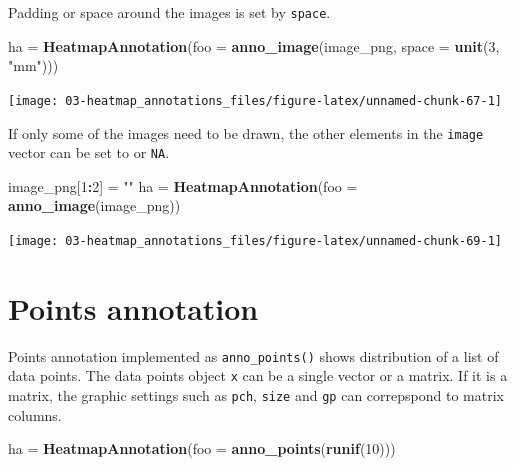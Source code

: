 \documentclass[]{book}
\newenvironment{Shaded}{\begin{snugshade}}{\end{snugshade}}
\newcommand{\KeywordTok}[1]{\textcolor[rgb]{0.13,0.29,0.53}{\textbf{#1}}}
\newcommand{\DataTypeTok}[1]{\textcolor[rgb]{0.13,0.29,0.53}{#1}}
\newcommand{\DecValTok}[1]{\textcolor[rgb]{0.00,0.00,0.81}{#1}}
\newcommand{\StringTok}[1]{\textcolor[rgb]{0.31,0.60,0.02}{#1}}
\newcommand{\OperatorTok}[1]{\textcolor[rgb]{0.81,0.36,0.00}{\textbf{#1}}}
\newcommand{\NormalTok}[1]{#1}
\theoremstyle{definition}
\theoremstyle{definition}
\theoremstyle{definition}
\theoremstyle{remark}
\begin{document}
Padding or space around the images is set by \texttt{space}.

\begin{Shaded}
\begin{Highlighting}[]
\NormalTok{ha =}\StringTok{ }\KeywordTok{HeatmapAnnotation}\NormalTok{(}\DataTypeTok{foo =} \KeywordTok{anno_image}\NormalTok{(image_png, }\DataTypeTok{space =} \KeywordTok{unit}\NormalTok{(}\DecValTok{3}\NormalTok{, }\StringTok{"mm"}\NormalTok{)))}
\end{Highlighting}
\end{Shaded}

\begin{center}\texttt{[image: 03-heatmap\_annotations\_files/figure-latex/unnamed-chunk-67-1]} \end{center}

If only some of the images need to be drawn, the other elements in the
\texttt{image} vector can be set to
\texttt{\textquotesingle{}\textquotesingle{}} or \texttt{NA}.

\begin{Shaded}
\begin{Highlighting}[]
\NormalTok{image_png[}\DecValTok{1}\OperatorTok{:}\DecValTok{2}\NormalTok{] =}\StringTok{ ""}
\NormalTok{ha =}\StringTok{ }\KeywordTok{HeatmapAnnotation}\NormalTok{(}\DataTypeTok{foo =} \KeywordTok{anno_image}\NormalTok{(image_png))}
\end{Highlighting}
\end{Shaded}

\begin{center}\texttt{[image: 03-heatmap\_annotations\_files/figure-latex/unnamed-chunk-69-1]} \end{center}

\section{Points annotation}\label{points-annotation}

Points annotation implemented as \texttt{anno\_points()} shows
distribution of a list of data points. The data points object \texttt{x}
can be a single vector or a matrix. If it is a matrix, the graphic
settings such as \texttt{pch}, \texttt{size} and \texttt{gp} can
correpspond to matrix columns.

\begin{Shaded}
\begin{Highlighting}[]
\NormalTok{ha =}\StringTok{ }\KeywordTok{HeatmapAnnotation}\NormalTok{(}\DataTypeTok{foo =} \KeywordTok{anno_points}\NormalTok{(}\KeywordTok{runif}\NormalTok{(}\DecValTok{10}\NormalTok{)))}
\end{Highlighting}
\end{Shaded}
\end{document}
